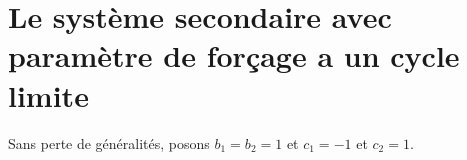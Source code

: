 



\section{Le système secondaire avec paramètre de forçage a un cycle limite}

Sans perte de généralités, posons $b_1 = b_2 = 1$ et $c_1 = -1$ et $c_2 = 1$.

